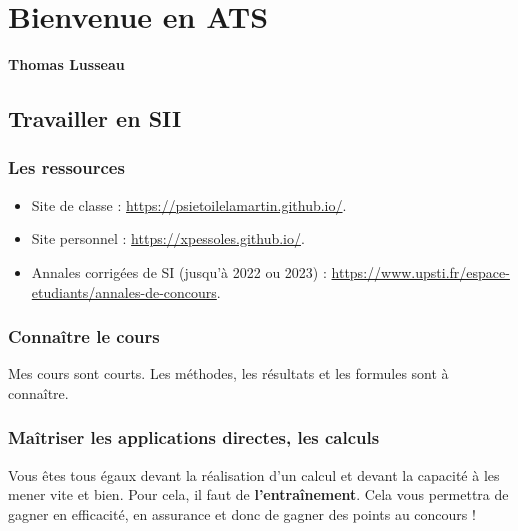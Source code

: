 %


\setchapterpreamble[u]{\margintoc}

\begingroup
{}
\chapter*{Bienvenue en ATS}
\endgroup
\setcounter{chapter}{1}

\begin{center}
\Large
\textsf{\textbf{Thomas Lusseau}}
\normalsize 

\vspace{.5cm} 

\normalsize
\end{center}
\section{Travailler en SII}
\subsection{Les ressources}
\begin{itemize}
\item Site de classe :  \url{https://psietoilelamartin.github.io/}.
\item Site personnel : \url{https://xpessoles.github.io/}.
\item Annales corrigées de SI (jusqu'à 2022 ou 2023) : \url{https://www.upsti.fr/espace-etudiants/annales-de-concours}. 

\end{itemize}
\subsection{Connaître le cours}
Mes cours sont courts. Les méthodes, les résultats et les formules sont à connaître. 

\subsection{Maîtriser les applications directes, les calculs}
Vous êtes tous égaux devant la réalisation d'un calcul et devant la capacité à les mener vite et bien. 
Pour cela, il faut de \textbf{l’entraînement}. Cela vous permettra de gagner en efficacité, en assurance et donc de gagner des points au concours !

